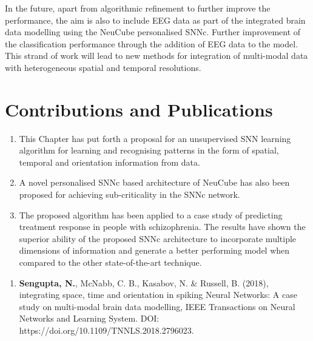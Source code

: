 In the future, apart from algorithmic refinement to further improve the performance, the aim is also to include EEG data as part of the integrated brain data modelling using the NeuCube personalised SNNc. Further improvement of the classification performance through the addition of EEG data to the model. This strand of work will lead to new methods for integration of multi-modal data with heterogeneous spatial and temporal resolutions. 

\pagebreak
\section{Contributions and Publications}
\begin{tcolorbox}[colback=black!5,colframe=black!40!black,title=Contributions]
	\itshape
	\begin{enumerate}
		\item This Chapter has put forth a proposal for an unsupervised SNN learning algorithm for learning and recognising patterns in the form of spatial, temporal and orientation information from data.
		\item A novel personalised SNNc based architecture of NeuCube has also been proposed for achieving sub-criticality in the SNNc network.
		\item The proposed algorithm has been applied to a case study of predicting treatment response in people with schizophrenia. The results have shown the superior ability of the proposed SNNc architecture to incorporate multiple dimensions of information and generate a better performing model when compared to the other state-of-the-art technique. 
	\end{enumerate}
	
\end{tcolorbox}

\begin{tcolorbox}[colback=black!5,colframe=black!40!black,title=Publications]
	\begin{enumerate}
		\item \textbf{Sengupta, N.}, McNabb, C. B., Kasabov, N. \& Russell, B. (2018), integrating space, time and orientation in spiking Neural Networks: A case study on multi-modal brain data modelling, IEEE Transactions on Neural Networks and Learning System. DOI: https://doi.org/10.1109/TNNLS.2018.2796023.
	\end{enumerate}
\end{tcolorbox}
